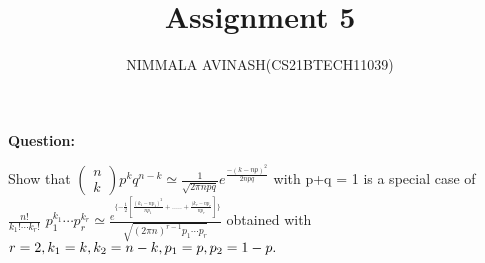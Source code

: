 \documentclass[journal,twocolumn]{IEEEtran}
\title{Assignment 5}
\author{NIMMALA AVINASH(CS21BTECH11039)}
\newcommand{\myvec}[1]{\ensuremath{\begin{pmatrix}#1\end{pmatrix}}}
\begin{document}
\maketitle

{\LARGE \textbf{Question:\\}}
\begin{Large}
Show that $\myvec{n \\ k}p^{k}q^{n-k}  \simeq \frac{1}{\sqrt{2\pi npq}}e^{\frac{-(k-np)^{2}}{2npq}}$ with p+q = 1 is a special case of $ \frac{n!}{k_{1}! \cdots k_{r}!}$ $p_{1}^{k_{1}} \cdots  p_{r}^{k_{r}}  \simeq \frac{e^{\{ -\frac{1}{2}[\frac{(k_{1}-np_{1})^{2}}{np_{1}}+ ..... + \frac{(k_{r}-np_{r}}{np_{r}}]\}}}{\sqrt{(2\pi n)^{r-1} p_{1} \cdots p_{r}}}$ obtained with $ r=2,k_{1}=k,k_{2}=n-k,p_{1}=p,p_{2}=1-p.\\ $


\end{Large}
\end{document}
